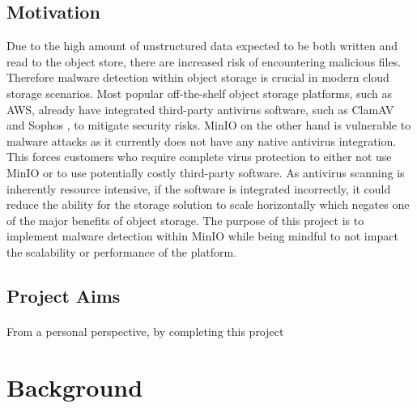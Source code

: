 \documentclass[12pt, conference, final, a4paper, onecolumn, compsoc]{IEEEtran}
\begin{document}
\subsection*{Motivation} %

Due to the high amount of unstructured data expected to be both written and read
to the object store, there are increased risk of encountering malicious files.
Therefore malware detection within object storage is crucial in modern cloud
storage scenarios. Most popular off-the-shelf object storage platforms, such as
AWS, already have integrated third-party antivirus software, such as ClamAV and
Sophos \citep{amazon-md}, to mitigate security risks. MinIO on the other hand is
vulnerable to malware attacks as it currently does not have any native antivirus
integration. This forces customers who require complete virus protection to
either not use MinIO or to use potentially costly third-party software. As
antivirus scanning is inherently resource intensive, if the software is
integrated incorrectly, it could reduce the ability for the storage solution to
scale horizontally which negates one of the major benefits of object storage.
The purpose of this project is to implement malware detection within MinIO while
being mindful to not impact the scalability or performance of the platform.

\subsection*{Project Aims} %


    \paragraph{}
    From a personal perspective, by completing this project


    \section{Background}

\end{document}
